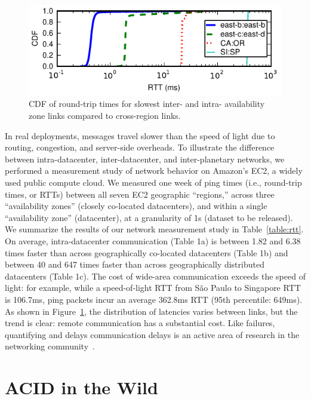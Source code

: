 \begin{figure}[t!]
\includegraphics[width=\columnwidth]{figs/ping-plot.pdf}\vspace{-1em}
\caption{CDF of round-trip times for slowest inter- and intra-
  availability zone links compared to cross-region links.}\vspace{-1em}
\label{fig:rtt}
\end{figure}

In real deployments, messages travel slower than the speed of light
due to routing, congestion, and server-side overheads. To illustrate
the difference between intra-datacenter, inter-datacenter, and
inter-planetary networks, we performed a measurement study of network
behavior on Amazon's EC2, a widely used public compute cloud. We
measured one week of ping times (i.e., round-trip times, or RTTs)
between all seven EC2 geographic ``regions,'' across three
``availability zones'' (closely co-located datacenters), and within a
single ``availability zone'' (datacenter), at a granularity of 1s
(dataset to be released). We summarize the results of our network
measurement study in Table~\ref{table:rtt}. On average,
intra-datacenter communication (Table 1a) is between 1.82 and 6.38
times faster than across geographically co-located datacenters (Table
1b) and between 40 and 647 times faster than across geographically
distributed datacenters (Table 1c). The cost of wide-area
communication exceeds the speed of light: for example, while a
speed-of-light RTT from S\~{a}o Paulo to Singapore RTT is 106.7ms,
ping packets incur an average 362.8ms RTT (95th percentile: 649ms). As
shown in Figure~\ref{fig:rtt}, the distribution of latencies varies
between links, but the trend is clear: remote communication has a
substantial cost. Like failures, quantifying and delays communication
delays is an active area of research in the networking
community~\cite{bobtail}.

\section{ACID in the Wild}
\label{sec:modernacid}

